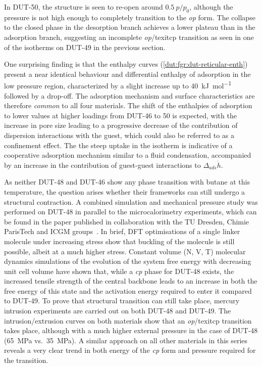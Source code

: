 In DUT-50, the structure is seen to re-open around \(0.5~p/p_0\), although 
the pressure is not high enough to completely transition to the
\textit{op} form. The collapse to the closed phase in the desorption
branch achieves a lower plateau than in the adsorption branch,
suggesting an incomplete \textit{op}/texit{cp} transition as seen in one 
of the isotherms on DUT-49 in the previous section.

One surprising finding is that the enthalpy curves 
(\autoref{dut:fgr:dut-reticular-enth}) present a near
identical behaviour and differential enthalpy of adsorption in the 
low pressure region, characterized by a slight increase up to 
\SI{40}{\kilo\joule\per\mol} followed by a drop-off. The adsorption
mechanism and surface characteristics are therefore \textit{common} to 
all four materials. The shift of the enthalpies of adsorption to lower 
values at higher loadings from DUT-46 to 50 is expected, with the increase
in pore size leading to a progressive decrease of the contribution 
of dispersion interactions with the guest, which could also be 
referred to as a confinement effect. The the steep uptake in the isotherm
is indicative of a cooperative adsorption mechanism similar to a fluid
condensation, accompanied by an increase in the contribution of 
guest-guest interactions to \(\Delta_{ads} \dot{h}\).

As neither DUT-48 and DUT-46 show any phase transition with
butane at this temperature, the question arises whether their frameworks
can still undergo a structural contraction. A combined simulation and 
mechanical pressure study was performed on DUT-48 in parallel to the 
microcalorimetry experiments, which can be found in the paper 
published in collaboration with the TU Dresden, Chimie ParisTech and 
ICGM groups~\cite{krauseAdsorptionContractionMechanics2018}.
In brief, DFT optimisations of a single linker molecule under increasing
stress show that buckling of the molecule is still possible, albeit
at a much higher stress. Constant volume (N, V, T) molecular dynamics
simulations of the evolution of the system free energy with decreasing
unit cell volume have shown that, while a \textit{cp} phase for DUT-48
exists, the increased tensile strength of the central backbone leads
to an increase in both the free energy of this state and the activation
energy required to enter it compared to DUT-49. To prove that structural
transition can still take place, mercury intrusion experiments are 
carried out on both DUT-48 and DUT-49. The intrusion/extrusion 
curves on both materials show that an \textit{op}/texit{cp} transition takes
place, although with a much higher external pressure in the case 
of DUT-48 (\SI{65}{\mega\pascal} vs.\ \SI{35}{\mega\pascal}). A similar 
approach on all other materials in this series reveals a very clear
trend in both energy of the \textit{cp} form and pressure required 
for the transition.

